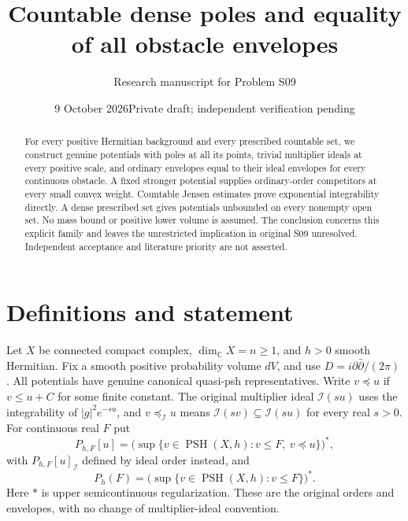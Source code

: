 \documentclass[11pt]{article}
\title{Countable dense poles and equality of all obstacle envelopes}
\author{Research manuscript for Problem S09}
\date{9 October 2026\quad Private draft; independent verification pending}
\theoremstyle{remark}\newtheorem{remark}[theorem]{Remark}
\newcommand{\ddc}{D}
\newcommand{\PSH}{\operatorname{PSH}}
\begin{document}
\maketitle
\begin{abstract}
For every positive Hermitian background and every prescribed countable
set, we construct genuine potentials with poles at all its points, trivial
multiplier ideals at every positive scale, and ordinary envelopes equal
to their ideal envelopes for every continuous obstacle. A fixed stronger
potential supplies ordinary-order competitors at every small convex
weight. Countable Jensen estimates prove exponential integrability
directly. A dense prescribed set gives potentials unbounded on every
nonempty open set. No mass bound or positive lower volume is assumed.
The conclusion concerns this explicit family and leaves the unrestricted
implication in original S09 unresolved. Independent acceptance and
literature priority are not asserted.
\end{abstract}

\section{Definitions and statement}
Let $X$ be connected compact complex, $\dim_{\mathbb C}X=n\geq1$, and
$h>0$ smooth Hermitian. Fix a smooth positive probability volume $dV$,
and use $\ddc=i\partial\bar\partial/(2\pi)$. All potentials have genuine
canonical quasi-psh representatives. Write $v\preceq u$ if $v\leq u+C$
for some finite constant. The original multiplier ideal $\mathcal I(su)$
uses the integrability of $|g|^2e^{-su}$, and $v\preceq_{\mathcal I}u$
means $\mathcal I(sv)\subseteq\mathcal I(su)$ for every real $s>0$.
For continuous real $F$ put
\[
 P_{h,F}[u]=\bigl(\sup\{v\in\PSH(X,h):v\leq F,
                                     \ v\preceq u\}\bigr)^*,
\]
with $P_{h,F}[u]_{\mathcal I}$ defined by ideal order instead, and
\[
 P_h(F)=\bigl(\sup\{v\in\PSH(X,h):v\leq F\}\bigr)^*.
\]
Here $*$ is upper semicontinuous regularization. These are the original
orders and envelopes, with no change of multiplier-ideal convention.
\end{document}
